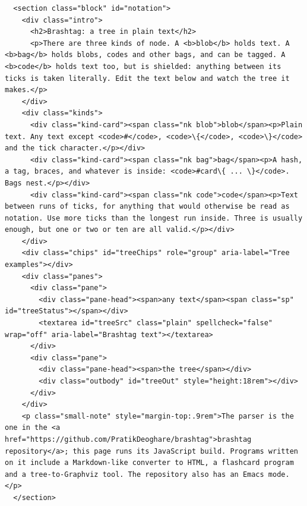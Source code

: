 \documentclass[10pt,a4paper]{article}
\begin{document}
\begin{Verbatim}
  <section class="block" id="notation">
    <div class="intro">
      <h2>Brashtag: a tree in plain text</h2>
      <p>There are three kinds of node. A <b>blob</b> holds text. A <b>bag</b> holds blobs, codes and other bags, and can be tagged. A <b>code</b> holds text too, but is shielded: anything between its ticks is taken literally. Edit the text below and watch the tree it makes.</p>
    </div>
    <div class="kinds">
      <div class="kind-card"><span class="nk blob">blob</span><p>Plain text. Any text except <code>#</code>, <code>\{</code>, <code>\}</code> and the tick character.</p></div>
      <div class="kind-card"><span class="nk bag">bag</span><p>A hash, a tag, braces, and whatever is inside: <code>#card\{ ... \}</code>. Bags nest.</p></div>
      <div class="kind-card"><span class="nk code">code</span><p>Text between runs of ticks, for anything that would otherwise be read as notation. Use more ticks than the longest run inside. Three is usually enough, but one or two or ten are all valid.</p></div>
    </div>
    <div class="chips" id="treeChips" role="group" aria-label="Tree examples"></div>
    <div class="panes">
      <div class="pane">
        <div class="pane-head"><span>any text</span><span class="sp" id="treeStatus"></span></div>
        <textarea id="treeSrc" class="plain" spellcheck="false" wrap="off" aria-label="Brashtag text"></textarea>
      </div>
      <div class="pane">
        <div class="pane-head"><span>the tree</span></div>
        <div class="outbody" id="treeOut" style="height:18rem"></div>
      </div>
    </div>
    <p class="small-note" style="margin-top:.9rem">The parser is the one in the <a href="https://github.com/PratikDeoghare/brashtag">brashtag repository</a>; this page runs its JavaScript build. Programs written on it include a Markdown-like converter to HTML, a flashcard program and a tree-to-Graphviz tool. The repository also has an Emacs mode.</p>
  </section>


\end{Verbatim}
\end{document}
